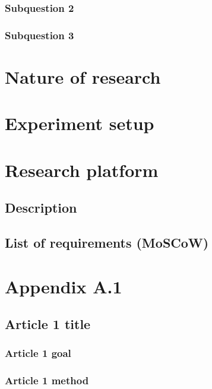 \documentclass[a4paper]{article}
\begin{document}
  \subsubsection{Subquestion 2}
  \subsubsection{Subquestion 3}
  \clearpage

  \section{Nature of research}
  \clearpage

  \section{Experiment setup}
  \clearpage

  \section{Research platform}
  \subsection{Description}
  \subsection{List of requirements (MoSCoW)}
  \clearpage

  \section{Appendix A.1} %

  \subsection{Article 1 title}
  \subsubsection{Article 1 goal}
  \subsubsection{Article 1 method}
\end{document}
